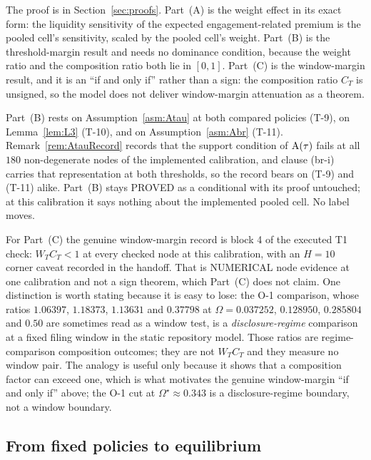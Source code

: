 The proof is in Section~\ref{sec:proofs}. Part~(A) is the weight effect in its exact form: the
liquidity sensitivity of the expected engagement-related premium is the pooled cell's sensitivity,
scaled by the pooled cell's weight. Part~(B) is the threshold-margin result and needs no dominance
condition, because the weight ratio and the composition ratio both lie in $[0,1]$. Part~(C) is the
window-margin result, and it is an ``if and only if'' rather than a sign: the composition ratio $C_T$
is unsigned, so the model does not deliver window-margin attenuation as a theorem.

\begin{remark}
\label{rem:T1record}
Part~(B) rests on Assumption~\ref{asm:Atau} at both compared policies (T-9), on Lemma~\ref{lem:L3}
(T-10), and on Assumption~\ref{asm:Abr} (T-11). Remark~\ref{rem:AtauRecord} records that the support
condition of $\mathrm{A}(\tau)$ fails at all $180$ non-degenerate nodes of the implemented calibration, and
clause (br-i) carries that representation at both thresholds, so the record bears on (T-9) and (T-11)
alike. Part~(B) stays PROVED as a conditional with its proof untouched; at this calibration
it says nothing about the implemented pooled cell. No label moves.

For Part~(C) the genuine window-margin record is block 4 of the executed T1 check: $W_T C_T < 1$ at
every checked node at this calibration, with an $H = 10$ corner caveat recorded in the handoff.
That is NUMERICAL node evidence at one calibration and not a sign theorem, which Part~(C)
does not claim. One distinction is worth stating because it is easy to lose: the O-1 comparison,
whose ratios $1.06397$, $1.18373$, $1.13631$ and $0.37798$ at
$\Omega = 0.037252$, $0.128950$, $0.285804$ and $0.50$ are sometimes read as a window test, is a
\emph{disclosure-regime} comparison at a fixed filing window in the static repository model. Those
ratios are regime-comparison composition outcomes; they are not $W_T C_T$ and they measure no window
pair. The analogy is useful only because it shows that a composition factor can exceed one, which is
what motivates the genuine window-margin ``if and only if'' above; the O-1 cut at
$\Omega^\star \approx 0.343$ is a disclosure-regime boundary, not a window boundary.
\end{remark}

\subsection{From fixed policies to equilibrium}
\label{sec:ge-results}

